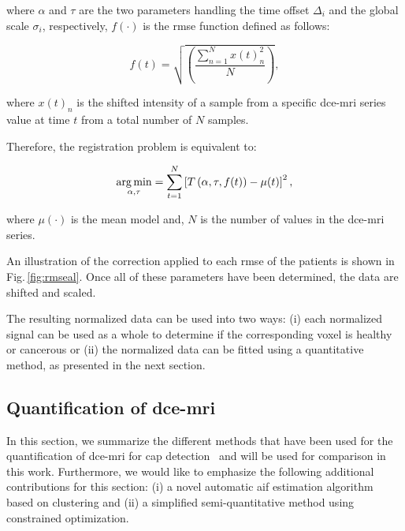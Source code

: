 \noindent where $\alpha$ and $\tau$ are the two parameters handling
the time offset $\Delta_i$ and the global scale $\sigma_i$,
respectively, $f(\cdot)$ is the \ac{rmse} function defined as follows:

\begin{equation}
  f(t) = \sqrt{ \left( \frac{\sum_{n=1}^{N} x(t)_{n}^2}{N}  \right) },
  \label{eq:rmsd}
\end{equation}

\noindent where $x(t)_n$ is the shifted intensity of a sample from a
specific \ac{dce}-\ac{mri} series value at time $t$ from a total number of $N$ samples.

Therefore, the registration problem is equivalent to:

\begin{equation}
  \operatorname*{arg\,min}_{\alpha, \tau} = \sum_{t=1}^{N} \left[ T\left(\alpha, \tau, f(t)\right) - \mu(t) \right]^{2} ,
  \label{eq:cost}
\end{equation}

\noindent where $\mu(\cdot)$ is the mean model and, $N$ is the number
of values in the \ac{dce}-\ac{mri} series.

An illustration of the correction applied to each \ac{rmse} of the patients is shown in Fig.\,\ref{fig:rmseal}.
Once all of these parameters have been determined, the data are shifted and scaled.

The resulting normalized data can be used into two ways: (i) each
normalized signal can be used as a whole to determine if the corresponding voxel is healthy or cancerous or (ii) the normalized data can be fitted using a quantitative method, as presented in the next section.

\subsection{Quantification of \ac{dce}-\ac{mri}}\label{sec:stateart}

In this section, we summarize the different methods that have been
used for the quantification of \ac{dce}-\ac{mri} for \ac{cap}
detection~\citep{lemaitre2015computer} and will be used for comparison in this work.
Furthermore, we would like to emphasize the following additional contributions for this section: (i) a novel automatic \ac{aif} estimation algorithm based on clustering and (ii) a simplified semi-quantitative method using constrained optimization.

